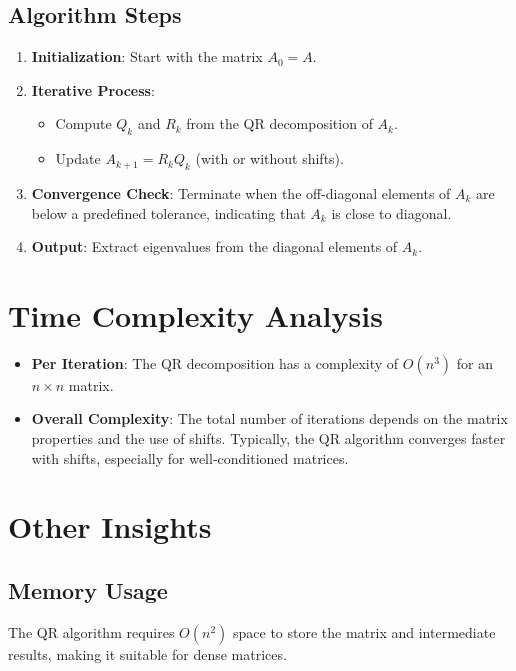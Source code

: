 \documentclass[12pt]{article}
\begin{document}
\subsection{Algorithm Steps}

\begin{enumerate}
    \item \textbf{Initialization}: Start with the matrix $A_0 = A$.
    \item \textbf{Iterative Process}:
        \begin{itemize}
            \item Compute $Q_k$ and $R_k$ from the QR decomposition of $A_k$.
            \item Update $A_{k+1} = R_k Q_k$ (with or without shifts).
        \end{itemize}
    \item \textbf{Convergence Check}: Terminate when the off-diagonal elements of $A_k$ are below a predefined tolerance, indicating that $A_k$ is close to diagonal.
    \item \textbf{Output}: Extract eigenvalues from the diagonal elements of $A_k$.
\end{enumerate}

\section{Time Complexity Analysis}

\begin{itemize}
    \item \textbf{Per Iteration}: The QR decomposition has a complexity of $O(n^3)$ for an $n \times n$ matrix.
    \item \textbf{Overall Complexity}: The total number of iterations depends on the matrix properties and the use of shifts. Typically, the QR algorithm converges faster with shifts, especially for well-conditioned matrices.
\end{itemize}

\section{Other Insights}

\subsection{Memory Usage}
The QR algorithm requires $O(n^2)$ space to store the matrix and intermediate results, making it suitable for dense matrices.
\end{document}
